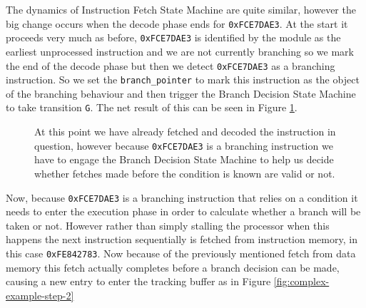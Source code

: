 \begin{sidewaysfigure}[htbp]
	
	\caption{In this signal diagram we join as a \texttt{LOAD} from data memory is already in progress, only finishing at cycle 112. This causes a large delay in between the successful fetch of the branching instruction and its eventual decoding and address calculation. The processor has built in mechanisms to stop any incorrect fetches that occur in between from propagating so this is something we have to emulate in the tracker.}
	\label{fig:complex-example-signal-diagram}
\end{sidewaysfigure}

The dynamics of Instruction Fetch State Machine are quite similar, however the big change occurs when the decode phase ends for \texttt{0xFCE7DAE3}. At the start it proceeds very much as before, \texttt{0xFCE7DAE3} is identified by the module as the earliest unprocessed instruction and we are not currently branching so we mark the end of the decode phase but then we detect \texttt{0xFCE7DAE3} as a branching instruction. So we set the \texttt{branch\_pointer} to mark this instruction as the object of the branching behaviour and then trigger the Branch Decision State Machine to take transition \texttt{G}. The net result of this can be seen in Figure \ref{fig:complex-example-step-1}.

\begin{figure}[htbp]
	\begin{subfigure}{\linewidth}
		
	\end{subfigure}
	\begin{subfigure}{\linewidth}
		
	\end{subfigure}
	\caption{At this point we have already fetched and decoded the instruction in question, however because \texttt{0xFCE7DAE3} is a branching instruction we have to engage the Branch Decision State Machine to help us decide whether fetches made before the condition is known are valid or not.}
	\label{fig:complex-example-step-1}
\end{figure} 

Now, because \texttt{0xFCE7DAE3} is a branching instruction that relies on a condition it needs to enter the execution phase in order to calculate whether a branch will be taken or not. However rather than simply stalling the processor when this happens the next instruction sequentially is fetched from instruction memory, in this case \texttt{0xFE842783}. Now because of the previously mentioned fetch from data memory this fetch actually completes before a branch decision can be made, causing a new entry to enter the tracking buffer as in Figure \ref{fig:complex-example-step-2}

